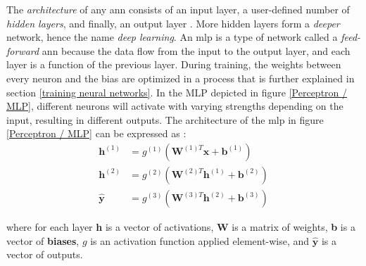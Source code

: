         The \textit{architecture} of any \gls{ann} consists of an input layer, a user-defined number of \textit{hidden layers}, and finally, an output layer \cite{razavi2021deep_exp_per}. More hidden layers form a \textit{deeper} network, hence the name \textit{deep learning}. An \gls{mlp} is a type of network called a \textit{feed-forward} \gls{ann} because the data flow from the input to the output layer, and each layer is a function of the previous layer. During training, the weights between every neuron and the bias are optimized in a process that is  further explained in section \ref{training neural networks}. In the MLP depicted in figure \ref{Perceptron / MLP}, different neurons will activate with varying strengths depending on the input, resulting in different outputs. The architecture of the \gls{mlp} in figure \ref{Perceptron / MLP} can be expressed as \cite{Goodfellow-et-al-2016}:
        \begin{align}\label{mlp outputlayer eq}
            \textbf{h}^{(1)} &= g^{(1)}(\textbf{W}^{(1)T}\textbf{x} + \textbf{b}^{(1)})\\
            \textbf{h}^{(2)} &= g^{(2)}(\textbf{W}^{(2)T}\textbf{h}^{(1)} + \textbf{b}^{(2)})\\
            \hat{\textbf{y}} &= g^{(3)}(\textbf{W}^{(3)T}\textbf{h}^{(2)} + \textbf{b}^{(3)})
        \end{align}

        
        
        
        where for each layer \textbf{h} is a vector of activations, \textbf{W} is a matrix of weights, \textbf{b} is a  vector of \textbf{biases}, $g$ is an activation function applied element-wise, and $\hat{\textbf{y}}$ is a vector of outputs. %
        
